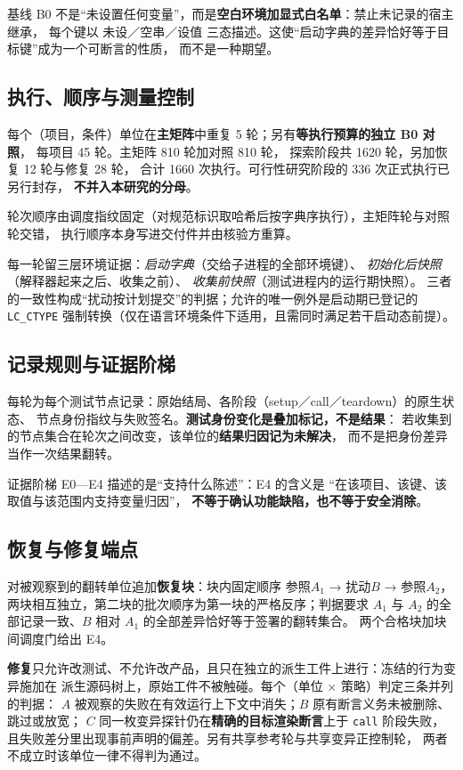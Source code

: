 \documentclass[11pt]{ctexart}
\begin{document}
基线 B0 不是“未设置任何变量”，而是\textbf{空白环境加显式白名单}：禁止未记录的宿主继承，
每个键以 未设／空串／设值 三态描述。这使“启动字典的差异恰好等于目标键”成为一个可断言的性质，
而不是一种期望。

\subsection{执行、顺序与测量控制}

每个（项目，条件）单位在\textbf{主矩阵}中重复 5 轮；另有\textbf{等执行预算的独立 B0 对照}，
每项目 45 轮。主矩阵 810 轮加对照 810 轮，
探索阶段共 1620 轮，另加恢复 12 轮与修复 28 轮，
合计 1660 次执行。可行性研究阶段的 336 次正式执行已另行封存，
\textbf{不并入本研究的分母}。

轮次顺序由调度指纹固定（对规范标识取哈希后按字典序执行），主矩阵轮与对照轮交错，
执行顺序本身写进交付件并由核验方重算。

每一轮留三层环境证据：\emph{启动字典}（交给子进程的全部环境键）、
\emph{初始化后快照}（解释器起来之后、收集之前）、
\emph{收集前快照}（测试进程内的运行期快照）。
三者的一致性构成“扰动按计划提交”的判据；允许的唯一例外是启动期已登记的
\texttt{LC\_CTYPE} 强制转换（仅在语言环境条件下适用，且需同时满足若干启动态前提）。

\subsection{记录规则与证据阶梯}

每轮为每个测试节点记录：原始结局、各阶段（setup／call／teardown）的原生状态、
节点身份指纹与失败签名。\textbf{测试身份变化是叠加标记，不是结果}：
若收集到的节点集合在轮次之间改变，该单位的\textbf{结果归因记为未解决}，
而不是把身份差异当作一次结果翻转。

证据阶梯 E0—E4 描述的是“支持什么陈述”：E4 的含义是
“在该项目、该键、该取值与该范围内支持变量归因”，
\textbf{不等于确认功能缺陷，也不等于安全消除}。

\subsection{恢复与修复端点}

对被观察到的翻转单位追加\textbf{恢复块}：块内固定顺序 参照$A_1$ → 扰动$B$ → 参照$A_2$，
两块相互独立，第二块的批次顺序为第一块的严格反序；判据要求
$A_1$ 与 $A_2$ 的全部记录一致、$B$ 相对 $A_1$ 的全部差异恰好等于签署的翻转集合。
两个合格块加块间调度门给出 E4。

\textbf{修复}只允许改测试、不允许改产品，且只在独立的派生工件上进行：冻结的行为变异施加在
派生源码树上，原始工件不被触碰。每个（单位 × 策略）判定三条并列的判据：
$A$ 被观察的失败在有效运行上下文中消失；$B$ 原有断言义务未被删除、跳过或放宽；
$C$ 同一枚变异探针仍在\textbf{精确的目标渲染断言}上于 \texttt{call} 阶段失败，
且失败差分里出现事前声明的偏差。另有共享参考轮与共享变异正控制轮，
两者不成立时该单位一律不得判为通过。
\end{document}
